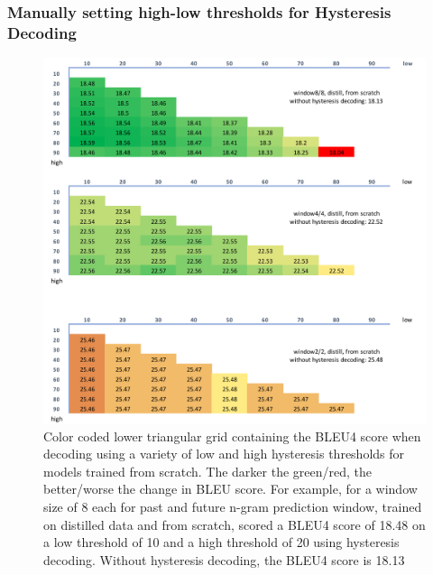 \subsubsection{Manually setting high-low thresholds for Hysteresis Decoding} \label{subsubsec:manual_hdec}

\begin{figure}[hpbt!]

    \centering
    \includegraphics[width=\textwidth]{images/chap04_images/hysteresis_decoding_manual_2.pdf}
    \caption{Color coded lower triangular grid containing the BLEU4 score when decoding using a variety of low and high hysteresis thresholds for models trained from scratch. The darker the green/red, the better/worse the change in BLEU score. For example, for a window size of 8 each for past and future n-gram prediction window, trained on distilled data and from scratch, scored a BLEU4 score of 18.48 on a low threshold of 10 and a high threshold of 20 using hysteresis decoding. Without hysteresis decoding, the BLEU4 score is 18.13}
    \label{fig:hysteresis_decoding_manual_2}
\end{figure}
